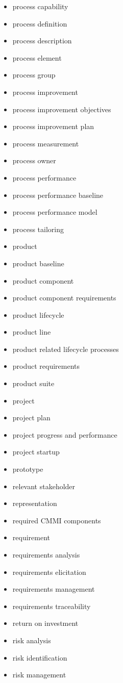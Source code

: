 \begin{itemize}
\item process capability
\item process definition
\item process description
\item process element
\item process group
\item process improvement
\item process improvement objectives
\item process improvement plan
\item process measurement
\item process owner
\item process performance
\item process performance baseline
\item process performance model
\item process tailoring
\item product
\item product baseline
\item product component
\item product component requirements
\item product lifecycle
\item product line
\item product related lifecycle processes
\item product requirements
\item product suite
\item project
\item project plan
\item project progress and performance
\item project startup
\item prototype
\item relevant stakeholder
\item representation
\item required CMMI components
\item requirement
\item requirements analysis
\item requirements elicitation
\item requirements management
\item requirements traceability
\item return on investment
\item risk analysis
\item risk identification
\item risk management

\end{itemize}
